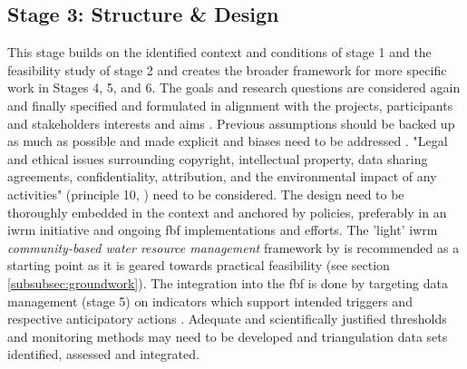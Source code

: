 \subsection{Stage 3: Structure \& Design}\label{subsec:stage3_design}
This stage builds on the identified context and conditions of stage 1 and the feasibility study of stage 2 and creates the broader framework for more specific work in Stages 4, 5, and 6. The goals and research questions are considered again and finally specified and formulated in alignment with the projects, participants and stakeholders interests and aims \autocite{conradReviewCitizenScience2011,minkmanCitizenScienceWater2015}. Previous assumptions should be backed up as much as possible and made explicit \autocite{silvertownNewDawnCitizen2009} and biases need to be addressed \autocite{escaTenPrinciplesCitizen2015,fraislCitizenScienceEnvironmental2022}. "Legal and ethical issues surrounding copyright, intellectual property, data sharing agreements, confidentiality, attribution, and the environmental impact of any activities" (principle 10, \textcite{escaTenPrinciplesCitizen2015}) need to be considered. The design need to be thoroughly embedded in the context and anchored by policies, preferably in an \acrlong{iwrm} initiative \autocite{cervoniImplementingIntegratedWater2008,sharpeCommunityBasedEcological2006} and ongoing \acrshort{fbf} implementations and efforts. The 'light' \acrshort{iwrm} \textit{community-based water resource management} framework by \autocite{dayCommunitybasedWaterResources2009} is recommended as a starting point as it is geared towards practical feasibility (see section \ref{subsubsec:groundwork}). The integration into the \acrshort{fbf} is done by targeting data management (stage 5) on indicators which support intended triggers and respective anticipatory actions \autocite{ifrcCommunityBasedSurveillanceGuiding2017}. Adequate and scientifically justified thresholds and monitoring methods may need to be developed and triangulation data sets identified, assessed and integrated. \newline
